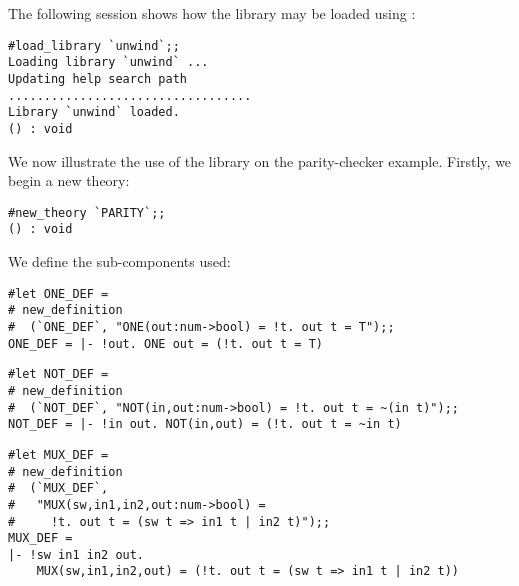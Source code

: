 The following session shows how the  library may be loaded using
:

\setcounter{sessioncount}{1}
\begin{session}\begin{verbatim}
#load_library `unwind`;;
Loading library `unwind` ...
Updating help search path
..................................
Library `unwind` loaded.
() : void
\end{verbatim}\end{session}

We now illustrate the use of the library on the parity-checker example.
Firstly, we begin a new theory:

\begin{session}\begin{verbatim}
#new_theory `PARITY`;;
() : void
\end{verbatim}\end{session}

\vfill

\noindent
We define the sub-components used:

\vfill

\begin{session}\begin{verbatim}
#let ONE_DEF =
# new_definition
#  (`ONE_DEF`, "ONE(out:num->bool) = !t. out t = T");;
ONE_DEF = |- !out. ONE out = (!t. out t = T)
\end{verbatim}\end{session}

\vfill

\begin{session}\begin{verbatim}
#let NOT_DEF =
# new_definition
#  (`NOT_DEF`, "NOT(in,out:num->bool) = !t. out t = ~(in t)");;
NOT_DEF = |- !in out. NOT(in,out) = (!t. out t = ~in t)
\end{verbatim}\end{session}

\vfill

\begin{session}\begin{verbatim}
#let MUX_DEF =
# new_definition
#  (`MUX_DEF`,
#   "MUX(sw,in1,in2,out:num->bool) =
#     !t. out t = (sw t => in1 t | in2 t)");;
MUX_DEF =
|- !sw in1 in2 out.
    MUX(sw,in1,in2,out) = (!t. out t = (sw t => in1 t | in2 t))
\end{verbatim}\end{session}

\vfill

